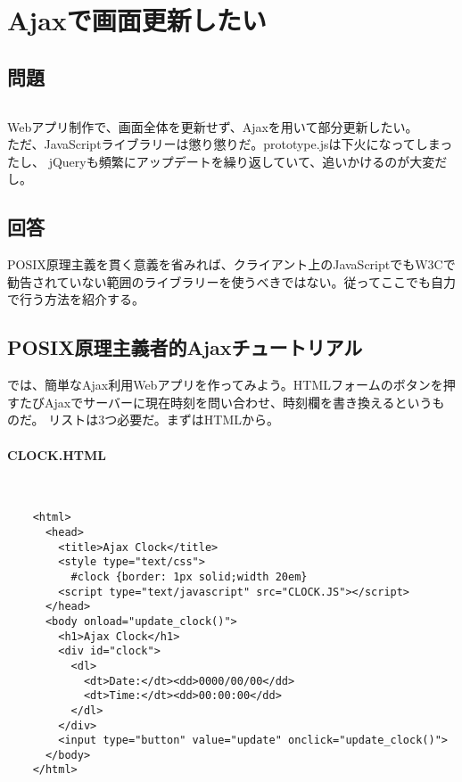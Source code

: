 \section{Ajaxで画面更新したい}
\label{recipe:Ajax_without_libraries}

\subsection*{問題}
\noindent
$\!\!\!\!\!$
\begin{grshfboxit}{160.0mm}
	Webアプリ制作で、画面全体を更新せず、Ajaxを用いて部分更新したい。\\
	ただ、JavaScriptライブラリーは懲り懲りだ。prototype.jsは下火になってしまったし、
	jQueryも頻繁にアップデートを繰り返していて、追いかけるのが大変だし。
\end{grshfboxit}

\subsection*{回答}
POSIX原理主義を貫く意義を省みれば、クライアント上のJavaScriptでもW3Cで勧告されていない範囲のライブラリーを使うべきではない。従ってここでも自力で行う方法を紹介する。

\subsection*{POSIX原理主義者的Ajaxチュートリアル}

では、簡単なAjax利用Webアプリを作ってみよう。HTMLフォームのボタンを押すたびAjaxでサーバーに現在時刻を問い合わせ、時刻欄を書き換えるというものだ。
リストは3つ必要だ。まずはHTMLから。
\paragraph{CLOCK.HTML} 　\\
\begin{frameboxit}{160.0mm}
\begin{verbatim}
	<html>
	  <head>
	    <title>Ajax Clock</title>
	    <style type="text/css">
	      #clock {border: 1px solid;width 20em}
	    <script type="text/javascript" src="CLOCK.JS"></script>
	  </head>
	  <body onload="update_clock()">
	    <h1>Ajax Clock</h1>
	    <div id="clock">
	      <dl>
	        <dt>Date:</dt><dd>0000/00/00</dd>
	        <dt>Time:</dt><dd>00:00:00</dd>
	      </dl>
	    </div>
	    <input type="button" value="update" onclick="update_clock()">
	  </body>
	</html>
\end{verbatim}
\end{frameboxit}

